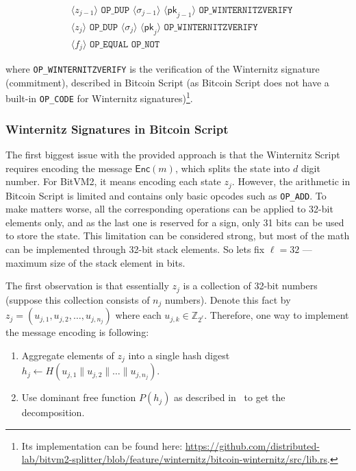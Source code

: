 \documentclass{iacrtrans}
\newcommand{\elem}[1]{\, \langle #1 \rangle \,}
\newcommand{\opcode}[1]{\, \texttt{#1} \,}
\begin{document}
\begin{empheqboxed}
  \begin{align*}
    &\elem{z_{j-1}} \opcode{OP\_DUP} \elem{\sigma_{j-1}}
    \elem{\mathsf{pk}_{j-1}} \opcode{OP\_WINTERNITZVERIFY} \\
    &\elem{z_{j}} \opcode{OP\_DUP} \elem{\sigma_{j}}
    \elem{\mathsf{pk}_{j}} \opcode{OP\_WINTERNITZVERIFY} \\
    &\elem{f_j} \opcode{OP\_EQUAL} \opcode{OP\_NOT}
  \end{align*}
\end{empheqboxed}

where \texttt{OP\_WINTERNITZVERIFY} is the verification of the
Winternitz signature (commitment), described in Bitcoin Script (as
  Bitcoin Script does not have a built-in \texttt{OP\_CODE} for
Winternitz signatures)\footnote{Its implementation can be found here:
\url{https://github.com/distributed-lab/bitvm2-splitter/blob/feature/winternitz/bitcoin-winternitz/src/lib.rs}.}.

\subsubsection{Winternitz Signatures in Bitcoin
  Script}\label{sec:winternitz-in-bitcoin-script}

The first biggest issue with the provided approach is that the Winternitz
Script requires encoding the message $\mathsf{Enc}(m)$, which splits 
the state into $d$ digit number. For BitVM2, it means encoding
each state $z_j$. However, the arithmetic in Bitcoin Script is limited and contains only basic
opcodes such as \texttt{OP\_ADD}. To make matters worse, all the
corresponding operations can be applied to 32-bit elements only, and
as the last one is reserved for a sign, only 31 bits can be used to
store the state. This limitation can be considered strong, but most of
the math can be implemented through 32-bit stack elements. So lets fix
$\ell = 32$ --- maximum size of the stack element in bits.

The first observation is that essentially $z_j$ is a collection of 32-bit numbers (suppose this collection consists of $n_j$ numbers). Denote this fact by $z_j = (u_{j,1}, u_{j,2}, \dots, u_{j, n_j})$ where each $u_{j,k} \in \mathbb{Z}_{2^{\ell}}$. Therefore, one way to implement the message encoding is following:
\begin{enumerate}
  \item Aggregate elements of $z_j$ into a single hash digest $h_j \gets H(u_{j,1} \parallel u_{j,2} \parallel \dots \parallel u_{j,n_j})$.
  \item Use dominant free function $P(h_j)$ as described in~\cite{applied-crypto} to get the decomposition.
\end{enumerate}
\end{document}
